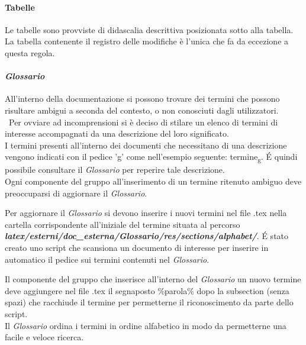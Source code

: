 \paragraph{Tabelle} 
Le tabelle sono provviste di didascalia descrittiva posizionata sotto alla tabella. La tabella contenente il registro delle modifiche è l’unica che fa da eccezione a questa regola.

\paragraph{\textit{Glossario}}
All'interno della documentazione si possono trovare dei termini che possono risultare ambigui a seconda del contesto, o non conosciuti dagli utilizzatori.\\\
Per ovviare ad incomprensioni si è deciso di stilare un elenco di termini di interesse accompagnati da una descrizione del loro significato.\\
I termini presenti all'interno dei documenti che necessitano di una descrizione vengono indicati con il pedice 'g' come nell'esempio seguente: termine\textsubscript{g}.
É quindi possibile consultare il \textit{Glossario} per reperire tale descrizione.
\\
Ogni componente del gruppo all'inserimento di un termine ritenuto ambiguo deve preoccuparsi di aggiornare il \textit{Glossario}.

Per aggiornare il \textit{Glossario} si devono inserire i nuovi termini nel file .tex nella cartella corrispondente all'iniziale del termine situata al percorso
\textbf{\textit{latex/esterni/doc\_esterna/Glossario/res/sections/alphabet/}}.
É stato creato uno script che scansiona un documento di interesse per inserire in automatico il pedice sui termini contenuti nel \textit{Glossario}.

Il componente del gruppo che inserisce all'interno del \textit{Glossario} un nuovo termine deve aggiungere nel file .tex il segnaposto \%parola\% dopo la subsection (senza spazi) che racchiude il termine per permetterne il riconoscimento da parte dello script.
\\
Il \textit{Glossario} ordina i termini in ordine alfabetico in modo da permetterne una facile e veloce ricerca.